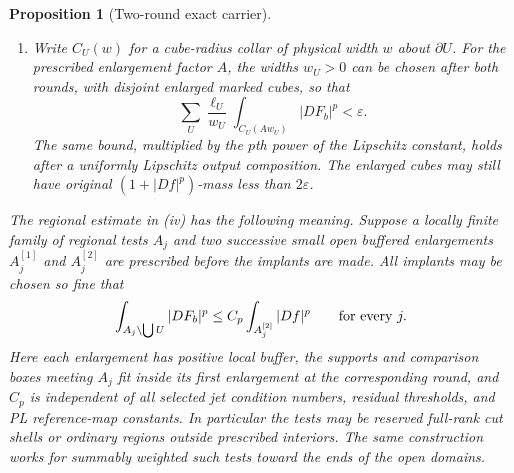 \documentclass[11pt]{article}
\numberwithin{equation}{section}
\newtheorem{proposition}[theorem]{Proposition}
\theoremstyle{definition}
\theoremstyle{remark}
\newcommand{\eps}{\varepsilon}
\begin{document}
\begin{proposition}[Two-round exact carrier]
\begin{enumerate}[label=\textup{(\roman*)}]
\begin{equation}
 \int_{\bigcup U}(1+|Df|^p)<\eps.
\end{equation}
For $p\geq3$ this family is empty.  Off the marked cubes the energy
has the universal buffered regional estimate described below.
\item Write $C_U(w)$ for a cube-radius collar of physical width $w$
about $\partial U$.  For the prescribed enlargement factor $A$, the
widths $w_U>0$ can be chosen after both rounds, with disjoint enlarged
marked cubes, so that
\begin{equation}\label{hp:marked-collar-budget}
 \sum_U\frac{\ell_U}{w_U}
             \int_{C_U(Aw_U)}|DF_b|^p<\eps.
\end{equation}
The same bound, multiplied by the $p$th power of the Lipschitz
constant, holds after a uniformly Lipschitz output composition.
The enlarged cubes may still have original $(1+|Df|^p)$-mass less
than $2\eps$.
\end{enumerate}

The regional estimate in \textup{(iv)} has the following meaning.
Suppose a locally finite family of regional tests $A_j$ and two
successive small open buffered enlargements $A_j^{[1]}$ and
$A_j^{[2]}$ are prescribed before the implants are made.  All implants
may be chosen so fine that
\begin{equation}\label{hp:regional-energy}
 \int_{A_j\setminus\bigcup U}|DF_b|^p
       \leq C_p\int_{A_j^{[2]}}|Df|^p
       \qquad\hbox{for every }j.
\end{equation}
Here each enlargement has positive local buffer, the supports and
comparison boxes meeting $A_j$ fit inside its first enlargement at
the corresponding round, and $C_p$ is independent of all selected
jet condition numbers, residual thresholds, and PL reference-map
constants.  In particular the tests may be reserved full-rank cut
shells or ordinary regions outside prescribed interiors.  The same
construction works for summably weighted such tests toward the ends
of the open domains.
\end{proposition}
\end{document}

